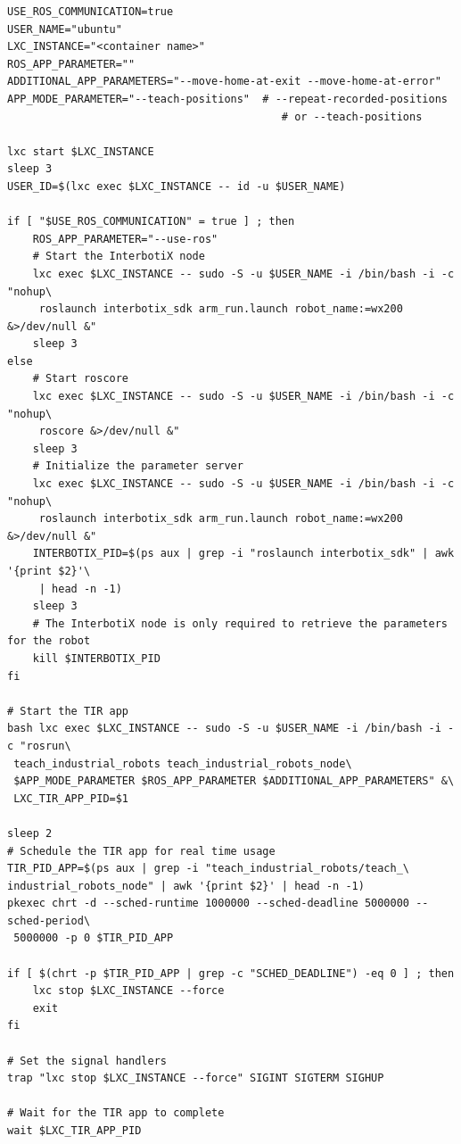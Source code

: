 \begin{lstlisting}[style=bash, caption={Script zum Starten der Roboter-Gesten-Anwendung}, label={lst:start_script_for_app}]
USE_ROS_COMMUNICATION=true
USER_NAME="ubuntu"
LXC_INSTANCE="<container name>"
ROS_APP_PARAMETER=""
ADDITIONAL_APP_PARAMETERS="--move-home-at-exit --move-home-at-error"
APP_MODE_PARAMETER="--teach-positions"  # --repeat-recorded-positions
                                           # or --teach-positions

lxc start $LXC_INSTANCE
sleep 3
USER_ID=$(lxc exec $LXC_INSTANCE -- id -u $USER_NAME)

if [ "$USE_ROS_COMMUNICATION" = true ] ; then
    ROS_APP_PARAMETER="--use-ros"
    # Start the InterbotiX node
    lxc exec $LXC_INSTANCE -- sudo -S -u $USER_NAME -i /bin/bash -i -c "nohup\
     roslaunch interbotix_sdk arm_run.launch robot_name:=wx200 &>/dev/null &"
    sleep 3
else
    # Start roscore
    lxc exec $LXC_INSTANCE -- sudo -S -u $USER_NAME -i /bin/bash -i -c "nohup\
     roscore &>/dev/null &"
    sleep 3
    # Initialize the parameter server
    lxc exec $LXC_INSTANCE -- sudo -S -u $USER_NAME -i /bin/bash -i -c "nohup\
     roslaunch interbotix_sdk arm_run.launch robot_name:=wx200 &>/dev/null &"
    INTERBOTIX_PID=$(ps aux | grep -i "roslaunch interbotix_sdk" | awk '{print $2}'\
     | head -n -1)
    sleep 3
    # The InterbotiX node is only required to retrieve the parameters for the robot
    kill $INTERBOTIX_PID
fi

# Start the TIR app
bash lxc exec $LXC_INSTANCE -- sudo -S -u $USER_NAME -i /bin/bash -i -c "rosrun\
 teach_industrial_robots teach_industrial_robots_node\
 $APP_MODE_PARAMETER $ROS_APP_PARAMETER $ADDITIONAL_APP_PARAMETERS" &\
 LXC_TIR_APP_PID=$1

sleep 2
# Schedule the TIR app for real time usage
TIR_PID_APP=$(ps aux | grep -i "teach_industrial_robots/teach_\
industrial_robots_node" | awk '{print $2}' | head -n -1)
pkexec chrt -d --sched-runtime 1000000 --sched-deadline 5000000 --sched-period\
 5000000 -p 0 $TIR_PID_APP

if [ $(chrt -p $TIR_PID_APP | grep -c "SCHED_DEADLINE") -eq 0 ] ; then
    lxc stop $LXC_INSTANCE --force
    exit
fi

# Set the signal handlers
trap "lxc stop $LXC_INSTANCE --force" SIGINT SIGTERM SIGHUP

# Wait for the TIR app to complete
wait $LXC_TIR_APP_PID
\end{lstlisting}\leavevmode\newline

